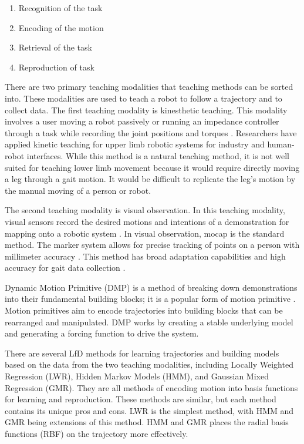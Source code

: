 \begin{enumerate}[noitemsep]
    \item Recognition of the task 
    \item Encoding of the motion 
    \item Retrieval of the task 
    \item Reproduction of task 
\end{enumerate} 

There are two primary teaching modalities that teaching methods can be sorted into. These modalities are used to teach a robot to follow a trajectory and to collect data. The first teaching modality is kinesthetic teaching. This modality involves a user moving a robot passively or running an impedance controller through a task while recording the joint positions and torques \cite{Calinon2018}. Researchers have applied kinetic teaching for upper limb robotic systems for industry and human-robot interfaces. While this method is a natural teaching method, it is not well suited for teaching lower limb movement because it would require directly moving a leg through a gait motion. It would be difficult to replicate the leg's motion by the manual moving of a person or robot. 

The second teaching modality is visual observation. In this teaching modality, visual sensors record the desired motions and intentions of a demonstration for mapping onto a robotic system \cite{CalinonLee19}. In visual observation, mocap is the standard method. The marker system allows for precise tracking of points on a person with millimeter accuracy \cite{ott2008motion}. This method has broad adaptation capabilities and high accuracy for gait data collection \cite{ViconGaiting}.

Dynamic Motion Primitive (DMP) is a method of breaking down demonstrations into their fundamental building blocks; it is a popular form of motion primitive \cite{ijspeert2013dynamical}. Motion primitives aim to encode trajectories into building blocks that can be rearranged and manipulated.  DMP works by creating a stable underlying model and generating a forcing function to drive the system.  

There are several LfD methods for learning trajectories and building models based on the data from the two teaching modalities, including Locally Weighted Regression (LWR), Hidden Markov Models (HMM), and Gaussian Mixed Regression (GMR). They are all methods of encoding motion into basis functions for learning and reproduction. These methods are similar, but each method contains its unique pros and cons. LWR is the simplest method, with HMM and GMR being extensions of this method. HMM and GMR places the radial basis functions (RBF) on the trajectory more effectively.  

